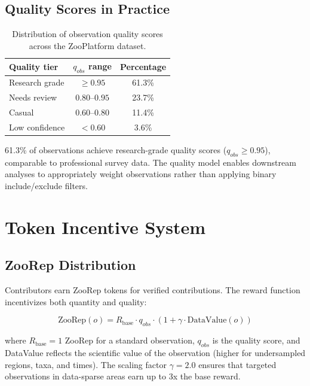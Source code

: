 \documentclass[11pt,a4paper]{article}
\begin{document}
\subsection{Quality Scores in Practice}

\begin{table}[H]
\centering
\caption{Distribution of observation quality scores across the
ZooPlatform dataset.}
\label{tab:quality}
\begin{tabular}{lcc}
\toprule
\textbf{Quality tier} & \textbf{$q_{obs}$ range} & \textbf{Percentage} \\
\midrule
Research grade & $\geq 0.95$ & 61.3\% \\
Needs review & $0.80$--$0.95$ & 23.7\% \\
Casual & $0.60$--$0.80$ & 11.4\% \\
Low confidence & $< 0.60$ & 3.6\% \\
\bottomrule
\end{tabular}
\end{table}

61.3\% of observations achieve research-grade quality scores ($q_{obs}
\geq 0.95$), comparable to professional survey data. The quality model
enables downstream analyses to appropriately weight observations rather
than applying binary include/exclude filters.


\section{Token Incentive System}
\label{sec:incentives}

\subsection{ZooRep Distribution}

Contributors earn ZooRep tokens for verified contributions. The reward
function incentivizes both quantity and quality:

\begin{equation}
  \text{ZooRep}(o) = R_{\text{base}} \cdot q_{obs} \cdot
  (1 + \gamma \cdot \text{DataValue}(o))
\end{equation}

where $R_{\text{base}} = 1$ ZooRep for a standard observation, $q_{obs}$
is the quality score, and DataValue reflects the scientific value of the
observation (higher for undersampled regions, taxa, and times). The
scaling factor $\gamma = 2.0$ ensures that targeted observations in
data-sparse areas earn up to 3x the base reward.
\end{document}
